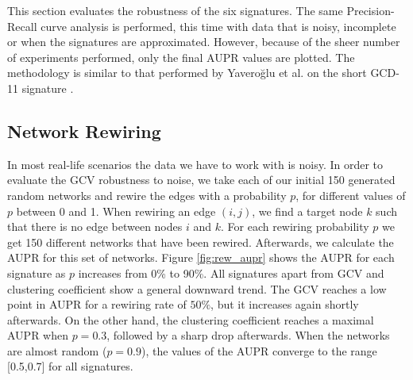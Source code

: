 This section evaluates the robustness of the six signatures. The same Precision-Recall curve analysis is performed, this time with data that is noisy, incomplete or when the signatures are approximated. However, because of the sheer number of experiments performed, only the final AUPR values are plotted. The methodology is similar to that performed by Yavero\u{g}lu et al. on the short GCD-11 signature \cite{yaverouglu2014revealing}. 

\subsection{Network Rewiring}

In most real-life scenarios the data we have to work with is noisy. In order to evaluate the GCV robustness to noise, we take each of our initial 150 generated random networks and rewire the edges with a probability $p$, for different values of $p$ between 0 and 1. When rewiring an edge $(i,j)$, we find a target node $k$ such that there is no edge between nodes $i$ and $k$. For each rewiring probability $p$ we get 150 different networks that have been rewired. Afterwards, we calculate the AUPR for this set of networks. Figure \ref{fig:rew_aupr} shows the AUPR for each signature as $p$ increases from 0\% to 90\%. All signatures apart from GCV and clustering coefficient show a general downward trend. The GCV reaches a low point in AUPR for a rewiring rate of $50\%$, but it increases again shortly afterwards. On the other hand, the clustering coefficient reaches a maximal AUPR when $p = 0.3$, followed by a sharp drop afterwards. When the networks are almost random ($p = 0.9$), the values of the AUPR converge to 
the range [0.5,0.7] for all signatures. 

